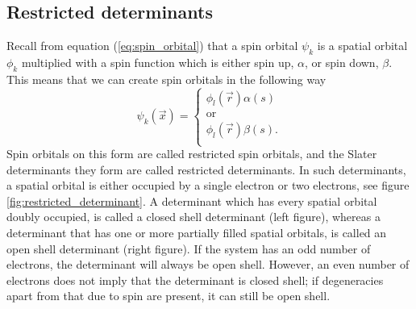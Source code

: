 \subsection{Restricted determinants}
Recall from equation (\ref{eq:spin_orbital}) that a spin orbital $\psi_k$ is a spatial orbital $\phi_k$ multiplied with a spin function which is either spin up, $\alpha$,
or spin down, $\beta$. This means that we can create spin orbitals in the following way
\begin{equation}
\label{eq:restricted_spinorbitals}
\psi_k(\vec x) = \left\{\begin{array}{c} \phi_l(\vec r)\alpha(s) \\
                                          \text{or} \\
                                          \phi_l(\vec r)\beta(s). \\
                       \end{array}\right.
\end{equation} 
Spin orbitals on this form are called restricted spin orbitals, and the Slater determinants they form are called restricted determinants. In such determinants, a spatial orbital is either
occupied by a single electron or two electrons, see figure \ref{fig:restricted_determinant}. A determinant which has
every spatial orbital doubly occupied, is called a closed shell determinant (left figure), whereas a
determinant that has one or more partially filled spatial orbitals, is called an open shell determinant (right figure). 
If the system has an odd number of electrons, the determinant will always be open shell.
However, an even number of electrons does not imply that the determinant is closed shell; if degeneracies apart from that due to spin are present, it can still be open shell.
